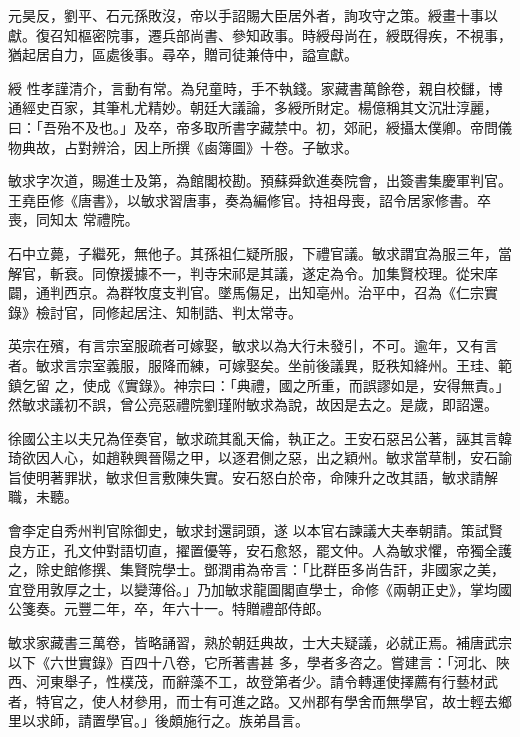 \begin{pinyinscope}
 元昊反，劉平、石元孫敗沒，帝以手詔賜大臣居外者，詢攻守之策。綬畫十事以獻。復召知樞密院事，遷兵部尚書、參知政事。時綬母尚在，綬既得疾，不視事，猶起居自力，區處後事。尋卒，贈司徒兼侍中，謚宣獻。



 綬
 性孝謹清介，言動有常。為兒童時，手不執錢。家藏書萬餘卷，親自校讎，博通經史百家，其筆札尤精妙。朝廷大議論，多綬所財定。楊億稱其文沉壯淳麗，曰：「吾殆不及也。」及卒，帝多取所書字藏禁中。初，郊祀，綬攝太僕卿。帝問儀物典故，占對辨洽，因上所撰《鹵簿圖》十卷。子敏求。



 敏求字次道，賜進士及第，為館閣校勘。預蘇舜欽進奏院會，出簽書集慶軍判官。王堯臣修《唐書》，以敏求習唐事，奏為編修官。持祖母喪，詔令居家修書。卒喪，同知太
 常禮院。



 石中立薨，子繼死，無他子。其孫祖仁疑所服，下禮官議。敏求謂宜為服三年，當解官，斬衰。同僚援據不一，判寺宋祁是其議，遂定為令。加集賢校理。從宋庠闢，通判西京。為群牧度支判官。墜馬傷足，出知亳州。治平中，召為《仁宗實錄》檢討官，同修起居注、知制誥、判太常寺。



 英宗在殯，有言宗室服疏者可嫁娶，敏求以為大行未發引，不可。逾年，又有言者。敏求言宗室義服，服降而練，可嫁娶矣。坐前後議異，貶秩知絳州。王珪、範鎮乞留
 之，使成《實錄》。神宗曰：「典禮，國之所重，而誤謬如是，安得無責。」然敏求議初不誤，曾公亮惡禮院劉瑾附敏求為說，故因是去之。是歲，即詔還。



 徐國公主以夫兄為侄奏官，敏求疏其亂天倫，執正之。王安石惡呂公著，誣其言韓琦欲因人心，如趙鞅興晉陽之甲，以逐君側之惡，出之穎州。敏求當草制，安石諭旨使明著罪狀，敏求但言敷陳失實。安石怒白於帝，命陳升之改其語，敏求請解職，未聽。



 會李定自秀州判官除御史，敏求封還詞頭，遂
 以本官右諫議大夫奉朝請。策試賢良方正，孔文仲對語切直，擢置優等，安石愈怒，罷文仲。人為敏求懼，帝獨全護之，除史館修撰、集賢院學士。鄧潤甫為帝言：「比群臣多尚告訐，非國家之美，宜登用敦厚之士，以變薄俗。」乃加敏求龍圖閣直學士，命修《兩朝正史》，掌均國公箋奏。元豐二年，卒，年六十一。特贈禮部侍郎。



 敏求家藏書三萬卷，皆略誦習，熟於朝廷典故，士大夫疑議，必就正焉。補唐武宗以下《六世實錄》百四十八卷，它所著書甚
 多，學者多咨之。嘗建言：「河北、陜西、河東舉子，性樸茂，而辭藻不工，故登第者少。請令轉運使擇薦有行藝材武者，特官之，使人材參用，而士有可進之路。又州郡有學舍而無學官，故士輕去鄉里以求師，請置學官。」後頗施行之。族弟昌言。




\end{pinyinscope}
